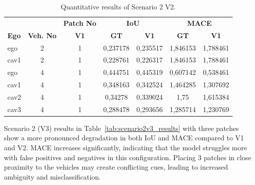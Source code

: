 \begin{table}[H]
    \centering
    \caption{Quantitative results of Scenario 2 V2.}
    \label{tab:scenario2v2_results}
    \begin{adjustbox}{max width=\textwidth}
        \begin{tabularx}{\textwidth}{l c c c c c c}
            \toprule
                &             &   \multicolumn{1}{c}{\textbf{Patch No}}  & \multicolumn{2}{c}{\textbf{IoU}} & \multicolumn{2}{c}{\textbf{MACE}}                            \\
            \cmidrule(lr){4-5}\cmidrule(lr){6-7}
            \textbf{Ego}           &
            \textbf{Veh. No}       &
            \textbf{V1}      &
            \textbf{GT}            & \textbf{V1}  &
            \textbf{GT}            & \textbf{V1}  \\
            \midrule %
            ego        & 2  & 1 & 0,237178 & 0,235517 & 1,846153 & 1,788461 \\
            cav1         & 2  & 1 & 0,228761 & 0,226317 & 1,846153 & 1,788461 \\
            \midrule
            ego        & 4  & 1 & 0,444751 & 0,445319 & 0,607142 & 0,538461 \\
            cav1        & 4  & 1 & 0,348163 & 0,342524 & 1,464285 & 1,307692 \\
            cav2        & 4  & 1 & 0,34278 & 0,339024 & 1,75 & 1,615384 \\
            cav3        & 4  & 1 & 0,288478 & 0,293656 & 1,285714 & 1,230769 \\
            \bottomrule
        \end{tabularx}
    \end{adjustbox}
\end{table}

Scenario 2 (V3) results in Table~\ref{tab:scenario2v3_results} with three patches show a more pronounced degradation in both IoU and MACE compared to V1 and V2.
MACE increases significantly, indicating that the model struggles more with false positives and negatives in this configuration.
Placing 3 patches in close proximity to the vehicles may create conflicting cues, leading to increased ambiguity and misclassification.

